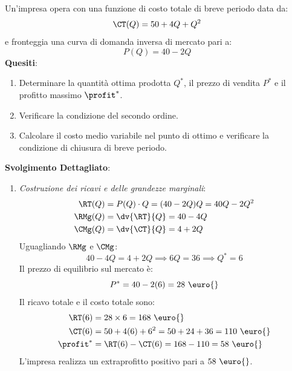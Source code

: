 \begin{esercizio}
Un'impresa opera con una funzione di costo totale di breve periodo data da:
\begin{equation*}
    \CT(Q) = 50 + 4Q + Q^2
\end{equation*}
e fronteggia una curva di domanda inversa di mercato pari a:
\begin{equation*}
    P(Q) = 40 - 2Q
\end{equation*}
\textbf{Quesiti}:
\begin{enumerate}
    \item Determinare la quantità ottima prodotta $Q^*$, il prezzo di vendita $P^*$ e il profitto massimo $\profit^*$.
    \item Verificare la condizione del secondo ordine.
    \item Calcolare il costo medio variabile nel punto di ottimo e verificare la condizione di chiusura di breve periodo.
\end{enumerate}

\tcbline
\textbf{Svolgimento Dettagliato}:
\begin{enumerate}
    \item \textit{Costruzione dei ricavi e delle grandezze marginali}:
    \begin{align*}
        \RT(Q) &= P(Q) \cdot Q = (40 - 2Q)Q = 40Q - 2Q^2 \\
        \RMg(Q) &= \dv{\RT}{Q} = 40 - 4Q \\
        \CMg(Q) &= \dv{\CT}{Q} = 4 + 2Q
    \end{align*}
    Uguagliando $\RMg$ e $\CMg$:
    \begin{equation*}
        40 - 4Q = 4 + 2Q \implies 6Q = 36 \implies Q^* = 6
    \end{equation*}
    Il prezzo di equilibrio sul mercato è:
    \begin{equation*}
        P^* = 40 - 2(6) = 28\text{ \euro{}}
    \end{equation*}
    Il ricavo totale e il costo totale sono:
    \begin{align*}
        \RT(6) &= 28 \times 6 = 168\text{ \euro{}} \\
        \CT(6) &= 50 + 4(6) + 6^2 = 50 + 24 + 36 = 110\text{ \euro{}} \\
        \profit^* &= \RT(6) - \CT(6) = 168 - 110 = 58\text{ \euro{}}
    \end{align*}
    L'impresa realizza un extraprofitto positivo pari a $58\text{ \euro{}}$.
    

\end{enumerate}
\end{esercizio}
